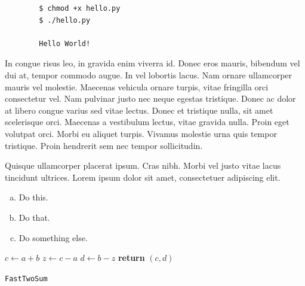 \documentclass{article}
\begin{document}
\begin{commandline}
	\begin{verbatim}
		$ chmod +x hello.py
		$ ./hello.py

		Hello World!
	\end{verbatim}
\end{commandline}

\begin{warn}[Notice:]
  In congue risus leo, in gravida enim viverra id. Donec eros mauris, bibendum vel dui at, tempor commodo augue. In vel lobortis lacus. Nam ornare ullamcorper mauris vel molestie. Maecenas vehicula ornare turpis, vitae fringilla orci consectetur vel. Nam pulvinar justo nec neque egestas tristique. Donec ac dolor at libero congue varius sed vitae lectus. Donec et tristique nulla, sit amet scelerisque orci. Maecenas a vestibulum lectus, vitae gravida nulla. Proin eget volutpat orci. Morbi eu aliquet turpis. Vivamus molestie urna quis tempor tristique. Proin hendrerit sem nec tempor sollicitudin.
\end{warn}

\begin{question}
	Quisque ullamcorper placerat ipsum. Cras nibh. Morbi vel justo vitae lacus tincidunt ultrices. Lorem ipsum dolor sit amet, consectetuer adipiscing elit.

	\begin{enumerate}[(a)]
		\item Do this.
		\item Do that.
		\item Do something else.
	\end{enumerate}
\end{question}

\begin{center}
	\begin{minipage}{0.5\linewidth} %
		\begin{algorithm}[H]
			\medskip
			$c \leftarrow a + b$ \;
			$z \leftarrow c - a$ \;
			$d \leftarrow b - z$ \;
			{\bf return} $(c,d)$ \;
			\caption{\texttt{FastTwoSum}} %
			\label{alg:fastTwoSum}   %
		\end{algorithm}
	\end{minipage}
\end{center}
\end{document}
